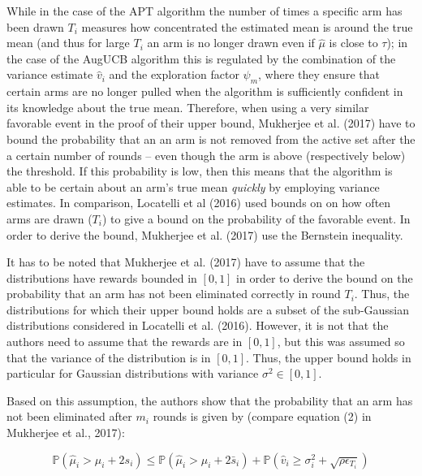 \documentclass[12pt,]{article}
\begin{document}
While in the case of the APT algorithm the number of times a specific
arm has been drawn \(T_i\) measures how concentrated the estimated mean
is around the true mean (and thus for large \(T_i\) an arm is no longer
drawn even if \(\hat{\mu}\) is close to \(\tau\)); in the case of the
AugUCB algorithm this is regulated by the combination of the variance
estimate \(\hat{v}_i\) and the exploration factor \(\psi_m\), where they
ensure that certain arms are no longer pulled when the algorithm is
sufficiently confident in its knowledge about the true mean. Therefore,
when using a very similar favorable event in the proof of their upper
bound, Mukherjee et al. (2017) have to bound the probability that an an
arm is not removed from the active set after the a certain number of
rounds -- even though the arm is above (respectively below) the
threshold. If this probability is low, then this means that the
algorithm is able to be certain about an arm's true mean \emph{quickly}
by employing variance estimates. In comparison, Locatelli et al (2016)
used bounds on on how often arms are drawn (\(T_i\)) to give a bound on
the probability of the favorable event. In order to derive the bound,
Mukherjee et al. (2017) use the Bernstein inequality.

It has to be noted that Mukherjee et al. (2017) have to assume that the
distributions have rewards bounded in \([0,1]\) in order to derive the
bound on the probability that an arm has not been eliminated correctly
in round \(T_i\). Thus, the distributions for which their upper bound
holds are a subset of the sub-Gaussian distributions considered in
Locatelli et al. (2016). However, it is not that the authors need to
assume that the rewards are in \([0,1]\), but this was assumed so that
the variance of the distribution is in \([0,1]\). Thus, the upper bound
holds in particular for Gaussian distributions with variance
\(\sigma^2 \in [0,1]\).

Based on this assumption, the authors show that the probability that an
arm has not been eliminated after \(m_i\) rounds is given by (compare
equation (2) in Mukherjee et al., 2017):

\begin{equation} \label{Mukherjee2017Equation2}
\mathbb{P}(\hat{\mu}_i > \mu_i + 2s_i) \leq \mathbb{P} (\hat{\mu}_i > \mu_i + 2\bar{s}_i) + \mathbb{P}(\hat{v}_i \geq \sigma^2_i + \sqrt{\rho \epsilon_{T_i}})
\end{equation}
\end{document}
